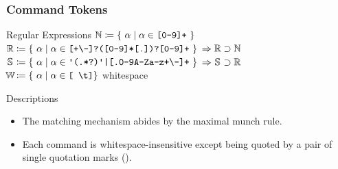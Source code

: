 \documentclass[10pt]{beamer}
\begin{document}
\begin{frame}[t] \frametitle{Command Tokens}

	\begin{block}{Regular Expressions}
		$\MSN \coloneqq \{\ \alpha \mid \alpha \in \texttt{[0-9]+} \ \}$ \\ [.24em]
		$\MSR \coloneqq \{\ \alpha \mid \alpha \in \texttt{[+\textbackslash-]?([0-9]*[.])?[0-9]+}\ \}$ \hfill
		$\Rightarrow \MSR \supset \MSN \ $ \\ [.24em]
		$\MSS \coloneqq \{\ \alpha \mid \alpha \in \texttt{\SingleQuote(.*?)\SingleQuote|[.0-9A-Za-z+\textbackslash-]+} \ \}$ \hfill
		$\Rightarrow \MSS \supset \MSR \ $ \\ [.24em]
		$\MSW \coloneqq \{\ \alpha \mid \alpha \in \texttt{[ \textbackslash{}t]} \}$ \hfill whitespace
	\end{block}

	\begin{block}{Descriptions}
		\begin{itemize}
			\item The matching mechanism abides by the maximal munch rule.
			\item Each command is whitespace-insensitive except being quoted by a pair of single quotation marks (\SingleQuote).
		\end{itemize}
	\end{block}

\end{frame}
\end{document}
